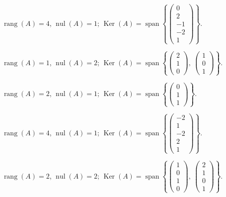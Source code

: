 \documentclass[12pt]{article}
\theoremstyle{remark}
\newcommand{\rang}{\operatorname{rang}}
\newcommand{\nul}{\operatorname{nul}}
\newcommand{\Ker}{\operatorname{Ker}}
\begin{document}
\begin{description}[style=nextline,leftmargin=3em,itemsep=0.45em]
\item[E224.] $\rang(A)=4$, $\nul(A)=1$; $\Ker(A)=\operatorname{span}\left\{\begin{pmatrix}0\\2\\-1\\-2\\1\end{pmatrix}\right\}$. 
\item[E225.] $\rang(A)=1$, $\nul(A)=2$; $\Ker(A)=\operatorname{span}\left\{\begin{pmatrix}2\\1\\0\end{pmatrix},\ \begin{pmatrix}1\\0\\1\end{pmatrix}\right\}$. 
\item[E226.] $\rang(A)=2$, $\nul(A)=1$; $\Ker(A)=\operatorname{span}\left\{\begin{pmatrix}0\\1\\1\end{pmatrix}\right\}$. 
\item[E227.] $\rang(A)=4$, $\nul(A)=1$; $\Ker(A)=\operatorname{span}\left\{\begin{pmatrix}-2\\1\\-2\\2\\1\end{pmatrix}\right\}$. 
\item[E228.] $\rang(A)=2$, $\nul(A)=2$; $\Ker(A)=\operatorname{span}\left\{\begin{pmatrix}1\\0\\1\\0\end{pmatrix},\ \begin{pmatrix}2\\1\\0\\1\end{pmatrix}\right\}$. 
\end{description}
\end{document}
